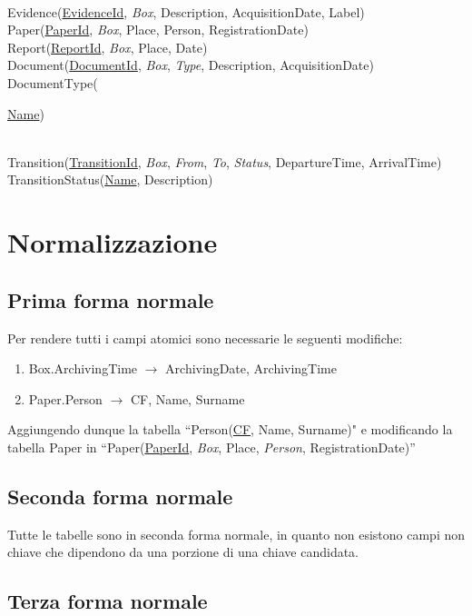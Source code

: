 \documentclass{article}
\begin{document}
\noindent \\
Evidence(\underline{EvidenceId}, \textit{Box}, Description, AcquisitionDate, Label) \\
Paper(\underline{PaperId}, \textit{Box}, Place, Person, RegistrationDate) \\
Report(\underline{ReportId}, \textit{Box}, Place, Date) \\
Document(\underline{DocumentId}, \textit{Box}, \textit{Type}, Description, AcquisitionDate) \\
DocumentType({\underline{Name})

\noindent \\
Transition(\underline{TransitionId}, \textit{Box}, \textit{From}, \textit{To}, \textit{Status}, DepartureTime, ArrivalTime) \\
TransitionStatus(\underline{Name}, Description)

\section{Normalizzazione}

\subsection{Prima forma normale}
Per rendere tutti i campi atomici sono necessarie le seguenti modifiche:
\begin{enumerate}
    \item Box.ArchivingTime $\rightarrow$ ArchivingDate, ArchivingTime
    \item Paper.Person $\rightarrow$ CF, Name, Surname
\end{enumerate}

\noindent
Aggiungendo dunque la tabella ``Person(\underline{CF}, Name, Surname)" e modificando la tabella Paper in  ``Paper(\underline{PaperId}, \textit{Box}, Place, \textit{Person}, RegistrationDate)''

\subsection{Seconda forma normale}

Tutte le tabelle sono in seconda forma normale, in quanto non esistono campi non chiave
che dipendono da una porzione di una chiave candidata.

\subsection{Terza forma normale}

}
\end{document}
